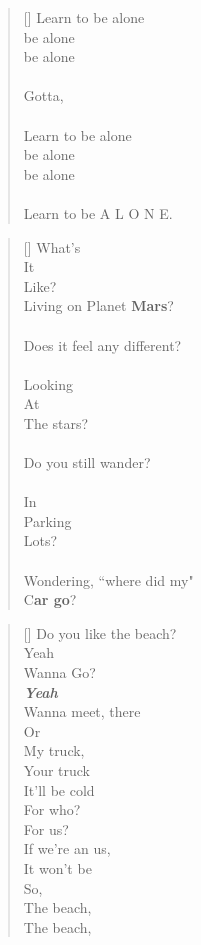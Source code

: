 \documentclass{article}
\begin{document}
\settowidth{\versewidth}{Than Tycho Brahe, or Erra Pater:}
\begin{verse}[\versewidth]
Learn to be alone \\
\tab be alone \\
\tab be alone \\
\\
Gotta, \\ 
\\
Learn to be alone \\
\tab be alone \\
\tab be alone \\
\\
Learn to be A L O N E. \\
\end{verse}
\newpage
{}
\settowidth{\versewidth}{Than Tycho Brahe, or Erra Pater:}
\begin{verse}[\versewidth]
What's \\
It \\
Like? \\
Living on Planet \textbf{Mars}? \\
\\
Does it feel any different? \\
\\
Looking \\
At \\
The stars? \\
\\
Do you still wander? \\
\\
In \\
Parking \\
Lots? \\
\\
Wondering, ``where did my" \\
C\textbf{ar go}? \\
\end{verse}


\settowidth{\versewidth}{Than Tycho Brahe, or Erra Pater:}
\begin{verse}[\versewidth]
Do you like the beach? \\
Yeah \\
Wanna Go? \\
\textit{\textbf{Yeah}} \\
Wanna meet, there \\
Or \\
My truck, \\
Your truck \\
It'll be cold \\
For who? \\
For us? \\
If we're an us, \\
It won't be \\
So, \\
The beach, \\
The beach, \\
\end{verse}
\end{document}
